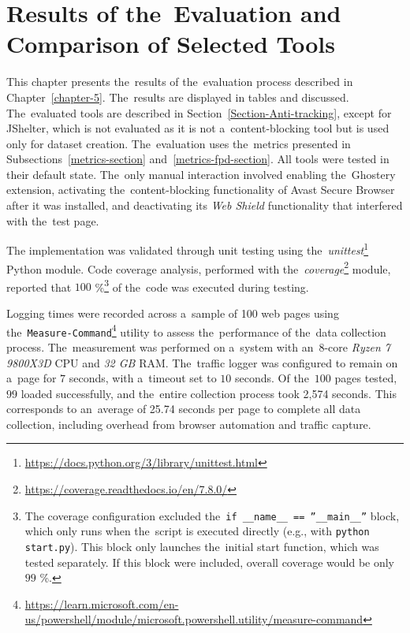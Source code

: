 
\chapter{Results of the~Evaluation and Comparison of Selected Tools}
\label{chapter-6}
This chapter presents the~results of the~evaluation process described in Chapter~\ref{chapter-5}. The~results are displayed in tables and discussed. The~evaluated tools are described in Section~\ref{Section-Anti-tracking}, except for JShelter, which is not evaluated as it is not a~content-blocking tool but is used only for dataset creation. The~evaluation uses the~metrics presented in Subsections~\ref{metrics-section} and~\ref{metrics-fpd-section}. All tools were tested in their default state. The~only manual interaction involved enabling the~Ghostery extension, activating the~content-blocking functionality of Avast Secure Browser after it was installed, and deactivating its \emph{Web Shield} functionality that interfered with the~test page.

The implementation was validated through unit testing using the~\textit{unittest}\footnote{\url{https://docs.python.org/3/library/unittest.html}} Python module. Code coverage analysis, performed with the~\textit{coverage}\footnote{\url{https://coverage.readthedocs.io/en/7.8.0/}} module, reported that $100$ \%\footnote{The coverage configuration excluded the~\texttt{if \_\_name\_\_ == ''\_\_main\_\_''} block, which only runs when the~script is executed directly (e.g., with \texttt{python start.py}). This block only launches the~initial start function, which was tested separately. If this block were included, overall coverage would be only $99$ \%.} of the~code was executed during testing.

Logging times were recorded across a~sample of 100 web pages using the~\texttt{Measure-{\linebreak}Command}\footnote{\url{https://learn.microsoft.com/en-us/powershell/module/microsoft.powershell.utility/measure-command}} utility to assess the~performance of the~data collection process. The~measurement was performed on a~system with an~8-core \emph{Ryzen 7 9800X3D} CPU and \emph{32 GB} RAM. The~traffic logger was configured to remain on a~page for $7$ seconds, with a~timeout set to $10$ seconds. Of the~$100$ pages tested, $99$ loaded successfully, and the~entire collection process took 2,574 seconds. This corresponds to an~average of 25.74 seconds per page to complete all data collection, including overhead from browser automation and traffic capture.

